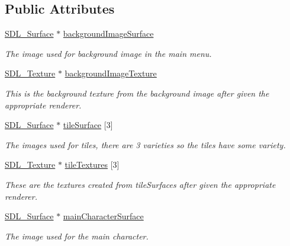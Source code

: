 \subsection*{Public Attributes}
\begin{DoxyCompactItemize}
\item 
\mbox{\hyperlink{struct_s_d_l___surface}{S\+D\+L\+\_\+\+Surface}} $\ast$ \mbox{\hyperlink{class_resource_manager_a838f1019a12db7404424df66f9bad362}{background\+Image\+Surface}}
\begin{DoxyCompactList}\small\item\em The image used for background image in the main menu. \end{DoxyCompactList}\item 
\mbox{\hyperlink{_s_d_l__render_8h_a17850d7f1f5de457727cb3cf66b3a7f5}{S\+D\+L\+\_\+\+Texture}} $\ast$ \mbox{\hyperlink{class_resource_manager_a33a1a84148c7ae43ac20894c59f52ebf}{background\+Image\+Texture}}
\begin{DoxyCompactList}\small\item\em This is the background texture from the background image after given the appropriate renderer. \end{DoxyCompactList}\item 
\mbox{\hyperlink{struct_s_d_l___surface}{S\+D\+L\+\_\+\+Surface}} $\ast$ \mbox{\hyperlink{class_resource_manager_a6755a6444754c714776e51bc0fc22fa7}{tile\+Surface}} \mbox{[}3\mbox{]}
\begin{DoxyCompactList}\small\item\em The images used for tiles, there are 3 varieties so the tiles have some variety. \end{DoxyCompactList}\item 
\mbox{\hyperlink{_s_d_l__render_8h_a17850d7f1f5de457727cb3cf66b3a7f5}{S\+D\+L\+\_\+\+Texture}} $\ast$ \mbox{\hyperlink{class_resource_manager_a8bc1363c8eac146c6e86e1b7a8a7ae7d}{tile\+Textures}} \mbox{[}3\mbox{]}
\begin{DoxyCompactList}\small\item\em These are the textures created from tile\+Surfaces after given the appropriate renderer. \end{DoxyCompactList}\item 
\mbox{\hyperlink{struct_s_d_l___surface}{S\+D\+L\+\_\+\+Surface}} $\ast$ \mbox{\hyperlink{class_resource_manager_a7dea3b6c85cc513e432c37b3be589ba2}{main\+Character\+Surface}}
\begin{DoxyCompactList}\small\item\em The image used for the main character. \end{DoxyCompactList}\item 

\end{DoxyCompactItemize}
